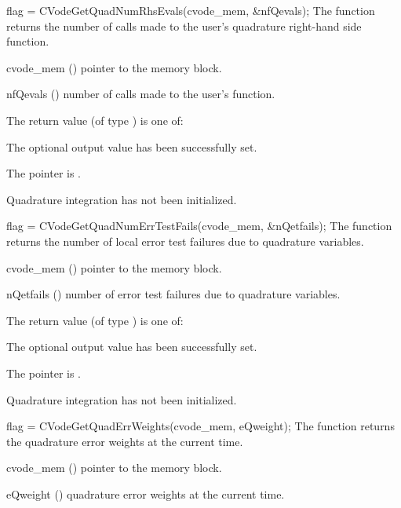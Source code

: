 {
  flag = CVodeGetQuadNumRhsEvals(cvode\_mem, \&nfQevals);
}
{
  The function  returns the 
  number of calls made to the user's quadrature right-hand side function.
}
{
  \begin{args}
  \item[cvode\_mem] ()
    pointer to the {\cvodes} memory block.
  \item[nfQevals] ()
    number of calls made to the user's  function.
  \end{args}
}
{
  The return value  (of type ) is one of:
  \begin{args}
  \item[\Id{CV\_SUCCESS}] 
    The optional output value has been successfully set.
  \item[\Id{CV\_MEM\_NULL}]
    The  pointer is .
  \item[\Id{CV\_NO\_QUAD}]
    Quadrature integration has not been initialized.
  \end{args}
}
{}
{
  flag = CVodeGetQuadNumErrTestFails(cvode\_mem, \&nQetfails);
}
{
  The function  returns the
  number of local error test failures due to quadrature variables.
}
{
  \begin{args}
  \item[cvode\_mem] ()
    pointer to the {\cvodes} memory block.
  \item[nQetfails] ()
    number of error test failures due to quadrature variables.
  \end{args}
}
{
  The return value  (of type ) is one of:
  \begin{args}
  \item[\Id{CV\_SUCCESS}] 
    The optional output value has been successfully set.
  \item[\Id{CV\_MEM\_NULL}]
    The  pointer is .
  \item[\Id{CV\_NO\_QUAD}]
    Quadrature integration has not been initialized.
  \end{args}
}
{}
{
  flag = CVodeGetQuadErrWeights(cvode\_mem, eQweight);
}
{
  The function  returns the quadrature error weights 
  at the current time.
}
{
  \begin{args}
  \item[cvode\_mem] ()
    pointer to the {\cvodes} memory block.
  \item[eQweight] ()
    quadrature error weights at the current time.
  \end{args}
}
